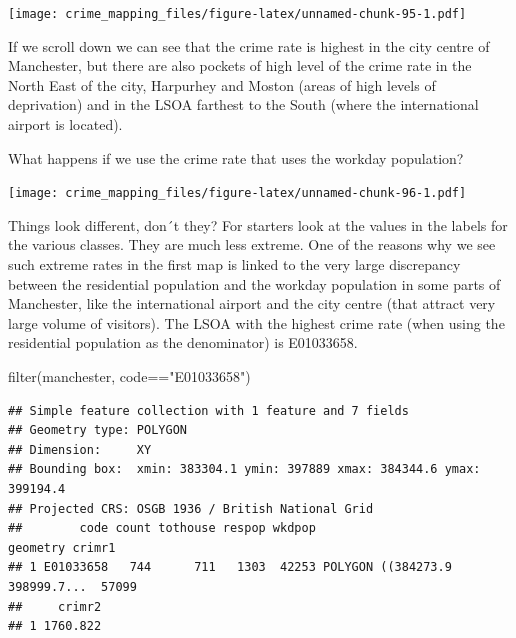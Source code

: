 \documentclass[
]{book}
\newenvironment{Shaded}{\begin{snugshade}}{\end{snugshade}}
\newcommand{\AttributeTok}[1]{\textcolor[rgb]{0.77,0.63,0.00}{#1}}
\newcommand{\FloatTok}[1]{\textcolor[rgb]{0.00,0.00,0.81}{#1}}
\newcommand{\FunctionTok}[1]{\textcolor[rgb]{0.00,0.00,0.00}{#1}}
\newcommand{\NormalTok}[1]{#1}
\newcommand{\SpecialCharTok}[1]{\textcolor[rgb]{0.00,0.00,0.00}{#1}}
\newcommand{\StringTok}[1]{\textcolor[rgb]{0.31,0.60,0.02}{#1}}
\begin{document}
\texttt{[image: crime\_mapping\_files/figure-latex/unnamed-chunk-95-1.pdf]}

If we scroll down we can see that the crime rate is highest in the city centre of Manchester, but there are also pockets of high level of the crime rate in the North East of the city, Harpurhey and Moston (areas of high levels of deprivation) and in the LSOA farthest to the South (where the international airport is located).

What happens if we use the crime rate that uses the workday population?

\begin{Shaded}
\end{Shaded}

\texttt{[image: crime\_mapping\_files/figure-latex/unnamed-chunk-96-1.pdf]}

Things look different, don´t they? For starters look at the values in the labels for the various classes. They are much less extreme. One of the reasons why we see such extreme rates in the first map is linked to the very large discrepancy between the residential population and the workday population in some parts of Manchester, like the international airport and the city centre (that attract very large volume of visitors). The LSOA with the highest crime rate (when using the residential population as the denominator) is E01033658.

\begin{Shaded}
\begin{Highlighting}[]
\FunctionTok{filter}\NormalTok{(manchester, code}\SpecialCharTok{==}\StringTok{"E01033658"}\NormalTok{)}
\end{Highlighting}
\end{Shaded}

\begin{verbatim}
## Simple feature collection with 1 feature and 7 fields
## Geometry type: POLYGON
## Dimension:     XY
## Bounding box:  xmin: 383304.1 ymin: 397889 xmax: 384344.6 ymax: 399194.4
## Projected CRS: OSGB 1936 / British National Grid
##        code count tothouse respop wkdpop                       geometry crimr1
## 1 E01033658   744      711   1303  42253 POLYGON ((384273.9 398999.7...  57099
##     crimr2
## 1 1760.822
\end{verbatim}
\end{document}
